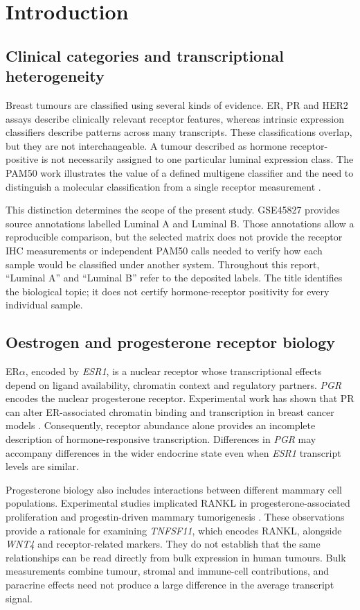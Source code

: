 \documentclass[11pt,a4paper]{article}
\newcommand{\gene}[1]{\textit{#1}}
\begin{document}
\section{Introduction}
\subsection{Clinical categories and transcriptional heterogeneity}
Breast tumours are classified using several kinds of evidence. ER, PR and HER2 assays describe clinically relevant receptor features, whereas intrinsic expression classifiers describe patterns across many transcripts. These classifications overlap, but they are not interchangeable. A tumour described as hormone receptor-positive is not necessarily assigned to one particular luminal expression class. The PAM50 work illustrates the value of a defined multigene classifier and the need to distinguish a molecular classification from a single receptor measurement \cite{Parker2009}.

This distinction determines the scope of the present study. GSE45827 provides source annotations labelled Luminal A and Luminal B. Those annotations allow a reproducible comparison, but the selected matrix does not provide the receptor IHC measurements or independent PAM50 calls needed to verify how each sample would be classified under another system. Throughout this report, ``Luminal A'' and ``Luminal B'' refer to the deposited labels. The title identifies the biological topic; it does not certify hormone-receptor positivity for every individual sample.

\subsection{Oestrogen and progesterone receptor biology}
ER$\alpha$, encoded by \gene{ESR1}, is a nuclear receptor whose transcriptional effects depend on ligand availability, chromatin context and regulatory partners. \gene{PGR} encodes the nuclear progesterone receptor. Experimental work has shown that PR can alter ER-associated chromatin binding and transcription in breast cancer models \cite{Mohammed2015}. Consequently, receptor abundance alone provides an incomplete description of hormone-responsive transcription. Differences in \gene{PGR} may accompany differences in the wider endocrine state even when \gene{ESR1} transcript levels are similar.

Progesterone biology also includes interactions between different mammary cell populations. Experimental studies implicated RANKL in progesterone-associated proliferation and progestin-driven mammary tumorigenesis \cite{Beleut2010,Schramek2010}. These observations provide a rationale for examining \gene{TNFSF11}, which encodes RANKL, alongside \gene{WNT4} and receptor-related markers. They do not establish that the same relationships can be read directly from bulk expression in human tumours. Bulk measurements combine tumour, stromal and immune-cell contributions, and paracrine effects need not produce a large difference in the average transcript signal.
\end{document}
